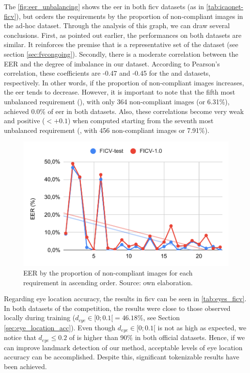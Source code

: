 The \autoref{fig:eer_unbalancing} shows the \acs{eer} in both \acs{ficv} datasets (as in \autoref{tab:icaonet-ficv}), but orders the requirements by the proportion of non-compliant images in the ad-hoc dataset. Through the analysis of this graph, we can draw several conclusions. First, as pointed out earlier, the performances on both datasets are similar. It reinforces the premise that \ficvtest is a representative set of the \ficvofficial dataset (see section \ref{sec:fvcongoing}). Secondly, there is a moderate correlation between the EER and the degree of imbalance in our dataset. According to Pearson's correlation, these coefficients are -0.47 and -0.45 for the \ficvtest and \ficvofficial datasets, respectively. In other words, if the proportion of non-compliant images increases, the \acs{eer} tends to decrease. However, it is important to note that the fifth most unbalanced requirement (\veiloverface), with only 364 non-compliant images (or 6.31\%), achieved 0.0\% of \acs{eer} in both datasets. Also, these correlations become very weak and positive ($< +0.1$) when computed starting from the seventh most unbalanced requirement (\toodarklight, with 456 non-compliant images or 7.91\%).
 
\begin{figure}[htb]
\centering
\includegraphics[width=0.8\linewidth]{images/graphs/eer_unbalancing.pdf}
\caption{EER by the proportion of non-compliant images for each requirement in ascending order. Source: own elaboration.}
\label{fig:eer_unbalancing}
\end{figure}
 
Regarding eye location accuracy, the results in \acs{ficv} can be seen in \autoref{tab:eyes_ficv}. In both datasets of the competition, the results were close to those observed locally during training ($d_{eye} \in [0;0.1[ = 46.18\%$, see Section \ref{sec:eye_location_acc}). Even though $d_{eye} \in [0;0.1[$ is not as high as expected, we notice that $d_{eye} \leq 0.2$ of \methodname is higher than $90\%$ in both official datasets. Hence, if we can improve landmark detection of our method, acceptable levels of eye location accuracy can be accomplished. Despite this, significant tokenizable results have been achieved.
 
